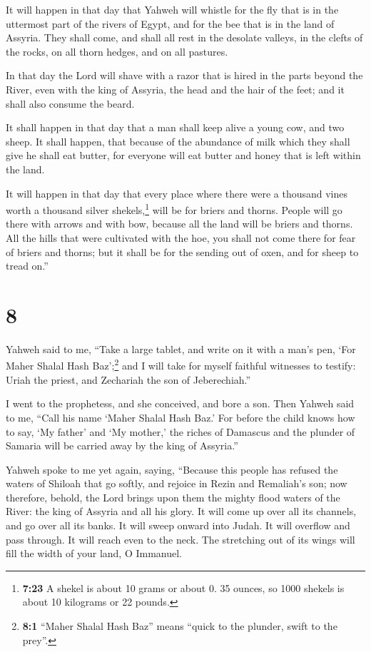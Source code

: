  It will happen in that day that Yahweh will whistle for
the fly that is in the uttermost part of the rivers of Egypt, and for
the bee that is in the land of Assyria.  They shall come,
and shall all rest in the desolate valleys, in the clefts of the rocks,
on all thorn hedges, and on all pastures.

 In that day the Lord will shave with a razor that is
hired in the parts beyond the River, even with the king of Assyria, the
head and the hair of the feet; and it shall also consume the beard.

 It shall happen in that day that a man shall keep alive
a young cow, and two sheep.  It shall happen, that
because of the abundance of milk which they shall give he shall eat
butter, for everyone will eat butter and honey that is left within the
land.

 It will happen in that day that every place where there
were a thousand vines worth a thousand silver shekels,\footnote{\textbf{7:23}
  A shekel is about 10 grams or about 0. 35 ounces, so 1000 shekels is
  about 10 kilograms or 22 pounds.} will be for briers and thorns.
 People will go there with arrows and with bow, because
all the land will be briers and thorns.  All the hills
that were cultivated with the hoe, you shall not come there for fear of
briers and thorns; but it shall be for the sending out of oxen, and for
sheep to tread on.''

\hypertarget{section-7}{%
\section{8}\label{section-7}}

 Yahweh said to me, ``Take a large tablet, and write on it
with a man's pen, `For Maher Shalal Hash Baz';\footnote{\textbf{8:1}
  ``Maher Shalal Hash Baz'' means ``quick to the plunder, swift to the
  prey''.}  and I will take for myself faithful witnesses
to testify: Uriah the priest, and Zechariah the son of Jeberechiah.''

 I went to the prophetess, and she conceived, and bore a
son. Then Yahweh said to me, ``Call his name `Maher Shalal Hash Baz.'
 For before the child knows how to say, `My father' and
`My mother,' the riches of Damascus and the plunder of Samaria will be
carried away by the king of Assyria.''

 Yahweh spoke to me yet again, saying, 
``Because this people has refused the waters of Shiloah that go softly,
and rejoice in Rezin and Remaliah's son;  now therefore,
behold, the Lord brings upon them the mighty flood waters of the River:
the king of Assyria and all his glory. It will come up over all its
channels, and go over all its banks.  It will sweep onward
into Judah. It will overflow and pass through. It will reach even to the
neck. The stretching out of its wings will fill the width of your land,
O Immanuel.

